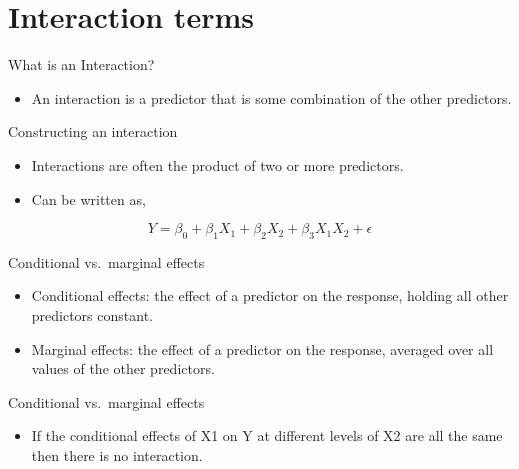 \documentclass[australian,ignorenonframetext,aspectratio=169]{beamer}
\providecommand{\tightlist}{%
  \setlength{\itemsep}{0pt}\setlength{\parskip}{0pt}}
\begin{document}
\begin{frame}{}
\protect\hypertarget{section}{}

\section{Interaction terms}

\end{frame}

\begin{frame}{What is an Interaction?}
\protect\hypertarget{what-is-an-interaction}{}

\begin{itemize}
\tightlist
\item
  An interaction is a predictor that is some combination of the other
  predictors.
\end{itemize}

\end{frame}

\begin{frame}{Constructing an interaction}
\protect\hypertarget{constructing-an-interaction}{}

\begin{itemize}
\tightlist
\item
  Interactions are often the product of two or more predictors.
\item
  Can be written as,
\end{itemize}

\[Y = \beta_0 + \beta_1X_1 + \beta_2X_2 + \beta_3X_1X_2 + \epsilon\]

\end{frame}

\begin{frame}{Conditional vs.~marginal effects}
\protect\hypertarget{conditional-vs.-marginal-effects}{}

\begin{itemize}
\item
  Conditional effects: the effect of a predictor on the response,
  holding all other predictors constant.
\item
  Marginal effects: the effect of a predictor on the response, averaged
  over all values of the other predictors.
\end{itemize}

\end{frame}

\begin{frame}{Conditional vs.~marginal effects}
\protect\hypertarget{conditional-vs.-marginal-effects-1}{}

\begin{itemize}
\tightlist
\item
  If the conditional effects of X1 on Y at different levels of X2 are
  all the same then there is no interaction.
\end{itemize}

\end{frame}
\end{document}

